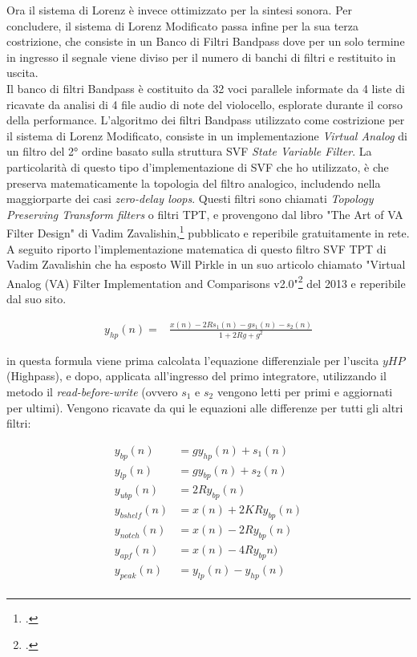 Ora il sistema di Lorenz è invece ottimizzato per la sintesi sonora.
Per concludere, il sistema di Lorenz Modificato passa infine per la sua terza costrizione,
che consiste in un Banco di Filtri Bandpass dove per un solo termine in ingresso 
il segnale viene diviso per il numero di banchi di filtri e restituito in uscita. \\
Il banco di filtri Bandpass è costituito da 32 voci parallele informate da 
4 liste di ricavate da analisi di 4 file audio di note del violocello,
esplorate durante il corso della performance.
L'algoritmo dei filtri Bandpass utilizzato come costrizione per il sistema
di Lorenz Modificato, consiste in un implementazione \textit{Virtual Analog} 
di un filtro del 2° ordine basato sulla struttura SVF \textit{State Variable Filter}.
La particolarità di questo tipo d'implementazione di SVF che ho utilizzato,
è che preserva matematicamente la topologia del filtro analogico,
includendo nella maggiorparte dei casi \textit{zero-delay loops}.
Questi filtri sono chiamati \textit{Topology Preserving Transform filters} o filtri TPT,
e provengono dal libro "The Art of VA Filter Design" di Vadim Zavalishin,\footcite{Zavalishin_VA_filter_design}
pubblicato e reperibile gratuitamente in rete. \\
A seguito riporto l'implementazione matematica di questo filtro SVF TPT di Vadim Zavalishin
che ha esposto Will Pirkle in un suo articolo chiamato 
"Virtual Analog (VA) Filter Implementation and Comparisons v2.0"\footcite{Pirkle_VA_filter_design}
del 2013 e reperibile dal suo sito.

\begin{align*}
    y_{hp}(n) = & \frac{x(n)- 2Rs_{1}(n) - gs_{1}(n) - s_{2}(n)}
    {1 + 2Rg + g^{2}}
\end{align*}

in questa formula viene prima calcolata l'equazione 
differenziale per l'uscita \( yHP \) (Highpass),
e dopo, applicata all'ingresso del primo integratore, 
utilizzando il metodo il \textit{read-before-write}
(ovvero \( s_{1} \) e \( s_{2} \) vengono letti per primi e aggiornati per ultimi). 
Vengono ricavate da qui le equazioni alle differenze per tutti gli altri filtri:

\begin{align*}
{y_{bp}(n)}& =  gy_{hp}(n) + s_{1}(n) \\
{y_{lp}(n)}& =  gy_{bp}(n) + s_{2}(n) \\
{y_{ubp}(n)}& =  2Ry_{bp}(n) \\
{y_{bshelf}(n)}& =  x(n) + 2KRy_{bp}(n) \\
{y_{notch}(n)}& =  x(n) - 2Ry_{bp}(n) \\
{y_{apf}(n)}& =  x(n) - 4Ry_{bp}n) \\
{y_{peak}(n)}& =  y_{lp}(n) - y_{hp}(n) \\
\end{align*}

